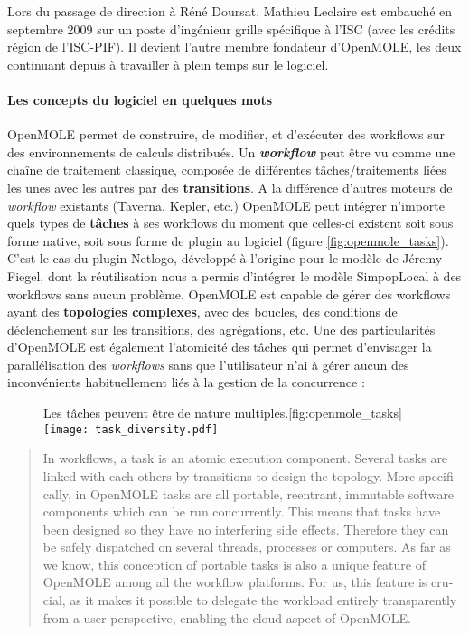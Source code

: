 Lors du passage de direction à Réné Doursat, Mathieu Leclaire est embauché en septembre 2009 sur un poste d'ingénieur grille spécifique à l'ISC (avec les crédits région de l'ISC-PIF). Il devient l'autre membre fondateur d'OpenMOLE, les deux continuant depuis à travailler à plein temps sur le logiciel.

\paragraph {Les concepts du logiciel en quelques mots}

OpenMOLE permet de construire, de modifier, et d'exécuter des workflows sur des environnements de calculs distribués. Un \textbf{\textit{workflow}} peut être vu comme une chaîne de traitement classique, composée de différentes tâches/traitements liées les unes avec les autres par des \textbf{transitions}. A la différence d'autres moteurs de \textit{workflow} existants (Taverna, Kepler, etc.) OpenMOLE peut intégrer n'importe quels types de \textbf{tâches} à ses workflows du moment que celles-ci existent soit sous forme native, soit sous forme de plugin au logiciel (figure \ref{fig:openmole_tasks}). C'est le cas du plugin Netlogo, développé à l'origine pour le modèle de Jéremy Fiegel, dont la réutilisation nous a permis d'intégrer le modèle SimpopLocal à des workflows sans aucun problème. OpenMOLE est capable de gérer des workflows ayant des \textbf{topologies complexes}, avec des boucles, des conditions de déclenchement sur les transitions, des agrégations, etc. Une des particularités d'OpenMOLE est également l'atomicité des tâches qui permet d'envisager la parallélisation des \textit{workflows} sans que l'utilisateur n'ai à gérer aucun des inconvénients habituellement liés à la gestion de la concurrence :

\begin{figure}[!htbp]
	\begin{sidecaption}{Les tâches peuvent être de nature multiples.}[fig:openmole_tasks]
		\centering
		\texttt{[image: task\_diversity.pdf]}{
		}
  \end{sidecaption}
\end{figure}


\foreignblockquote{english}[{\cite[7]{Reuillon2013}}]{In workflows, a task is an atomic execution component. Several tasks are linked with each-others by transitions to design the topology. More specifically, in OpenMOLE tasks are all portable, reentrant, immutable software components which can be run concurrently. This means that tasks have been designed so they have no interfering side effects. Therefore they can be safely dispatched on several threads, processes or computers. As far as we know, this conception of portable tasks is also a unique feature of OpenMOLE among all the workflow platforms. For us, this feature is crucial, as it makes it possible to delegate the workload entirely transparently from a user perspective, enabling the cloud aspect of OpenMOLE.}

